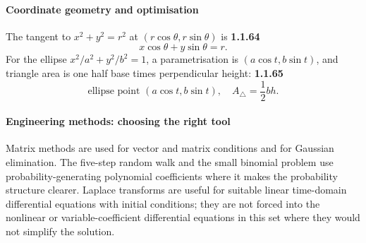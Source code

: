 \paragraph*{Coordinate geometry and optimisation}
The tangent to $x^2+y^2=r^2$ at $(r\cos\theta,r\sin\theta)$ is
\noindent\textbf{1.1.64}\quad
\[
x\cos\theta+y\sin\theta=r.\tag{1.1.64.1}
\]
For the ellipse $x^2/a^2+y^2/b^2=1$, a parametrisation is $(a\cos t,b\sin t)$, and triangle area is one half base times perpendicular height:
\noindent\textbf{1.1.65}\quad
\[\text{ellipse point }(a\cos t,b\sin t),\quad A_{\triangle}=\frac12 bh.\tag{1.1.65.1}\]

\paragraph*{Engineering methods: choosing the right tool}
Matrix methods are used for vector and matrix conditions and for Gaussian elimination. The five-step random walk and the small binomial problem use probability-generating polynomial coefficients where it makes the probability structure clearer. Laplace transforms are useful for suitable linear time-domain differential equations with initial conditions; they are not forced into the nonlinear or variable-coefficient differential equations in this set where they would not simplify the solution.
